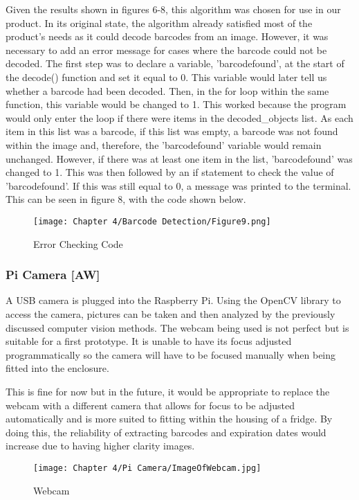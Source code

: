 Given the results shown in figures 6-8, this algorithm was chosen for use in our product.
In its original state, the algorithm already satisfied most of the product's needs as it could decode barcodes from an image.
However, it was necessary to add an error message for cases where the barcode could not be decoded.
The first step was to declare a variable, 'barcodefound', at the start of the decode() function and set it equal to 0.
This variable would later tell us whether a barcode had been decoded.
Then, in the for loop within the same function, this variable would be changed to 1.
This worked because the program would only enter the loop if there were items in the decoded\_objects list.
As each item in this list was a barcode, if this list was empty, a barcode was not found within the image and, therefore, the 'barcodefound' variable would remain unchanged.
However, if there was at least one item in the list, 'barcodefound' was changed to 1.
This was then followed by an if statement to check the value of 'barcodefound'.
If this was still equal to 0, a message was printed to the terminal.
This can be seen in figure 8, with the code shown below.

\begin{figure}[H]        
    \centering
    \texttt{[image: Chapter 4/Barcode Detection/Figure9.png]}
    \caption{Error Checking Code}
    \label{fig:bc9} 
\end{figure} 

\subsubsection{Pi Camera [AW]}

A USB camera is plugged into the Raspberry Pi.
Using the OpenCV library to access the camera, pictures can be taken and then analyzed by the previously discussed computer vision methods.
The webcam being used is not perfect but is suitable for a first prototype.
It is unable to have its focus adjusted programmatically so the camera will have to be focused manually when being fitted into the enclosure.

This is fine for now but in the future, it would be appropriate to replace the webcam with a different camera that allows for focus to be adjusted automatically and is more suited to fitting within the housing of a fridge.
By doing this, the reliability of extracting barcodes and expiration dates would increase due to having higher clarity images.

\begin{figure}[H]        
    \centering
    \texttt{[image: Chapter 4/Pi Camera/ImageOfWebcam.jpg]}
    \caption{Webcam}
    \label{fig:webcam} 
\end{figure} 

